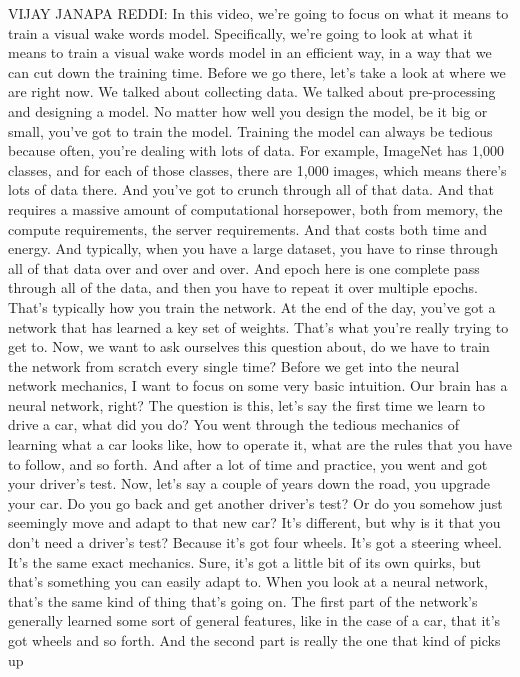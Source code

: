 VIJAY JANAPA REDDI: In this video, we're going
to focus on what it means to train a visual wake words model.
Specifically, we're going to look at what it means to train a visual wake
words model in an efficient way, in a way that we can cut down the training
time.
Before we go there, let's take a look at where we are right now.
We talked about collecting data.
We talked about pre-processing and designing a model.
No matter how well you design the model, be it big or small,
you've got to train the model.
Training the model can always be tedious because often,
you're dealing with lots of data.
For example, ImageNet has 1,000 classes, and for each of those classes,
there are 1,000 images, which means there's lots of data there.
And you've got to crunch through all of that data.
And that requires a massive amount of computational horsepower,
both from memory, the compute requirements, the server requirements.
And that costs both time and energy.
And typically, when you have a large dataset,
you have to rinse through all of that data over and over and over.
And epoch here is one complete pass through all of the data,
and then you have to repeat it over multiple epochs.
That's typically how you train the network.
At the end of the day, you've got a network
that has learned a key set of weights.
That's what you're really trying to get to.
Now, we want to ask ourselves this question about,
do we have to train the network from scratch every single time?
Before we get into the neural network mechanics,
I want to focus on some very basic intuition.
Our brain has a neural network, right?
The question is this, let's say the first time
we learn to drive a car, what did you do?
You went through the tedious mechanics of learning what a car looks like,
how to operate it, what are the rules that you have to follow, and so forth.
And after a lot of time and practice, you went and got your driver's test.
Now, let's say a couple of years down the road, you upgrade your car.
Do you go back and get another driver's test?
Or do you somehow just seemingly move and adapt to that new car?
It's different, but why is it that you don't need a driver's test?
Because it's got four wheels.
It's got a steering wheel.
It's the same exact mechanics.
Sure, it's got a little bit of its own quirks,
but that's something you can easily adapt to.
When you look at a neural network, that's
the same kind of thing that's going on.
The first part of the network's generally
learned some sort of general features, like in the case of a car,
that it's got wheels and so forth.
And the second part is really the one that kind of picks up
